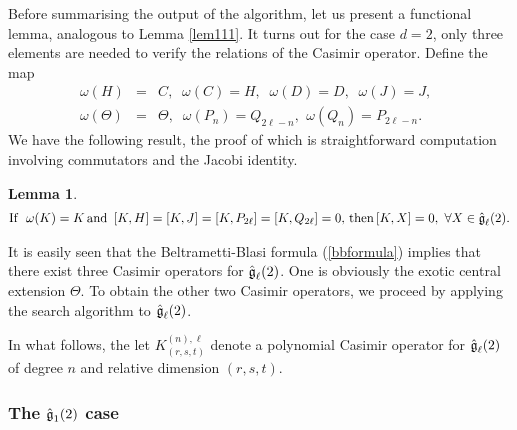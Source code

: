 \documentclass[12pt]{article}
\def\nn{\nonumber}
\newtheorem{lemma}{Lemma}%
\begin{document}
Before summarising the output of the algorithm, let us present a functional
lemma, analogous to Lemma \ref{lem111}. It turns out for the case $d=2$, only three
elements are needed to verify the relations of the Casimir operator. 
Define the map
\begin{eqnarray}
\omega(H)&=&C, \,\,\ \omega(C)=H, \,\,\ \omega(D)=D,\,\,\ \omega(J)=J, \,\,\
 \nn \\
\omega(\Theta)&=&\Theta, \,\,\ \omega(P_{n})=Q_ {2\ell-n} ,\,\ \omega(Q_{n})=P_
	{2\ell-n}.\label{omg2} 
\end{eqnarray}
We have the following result, the proof of which is straightforward computation
involving commutators and the Jacobi identity. 
\begin{lemma}\label{lem222}
\begin{eqnarray}
\text{If}\,\,\ \omega(K)=K  \, \text{and}\,\ [K, H]=[K,J]=[K,P_ {2\ell}]=[K,Q_
	{2\ell}]=0, \,\text{then} \, [K, X]=0, \,\, \forall X \in
	\mathfrak{\Hat{g}}_{\ell}(2).
\nn 
\end{eqnarray} 
 \end{lemma}
 
It is easily seen that the Beltrametti-Blasi formula (\ref{bbformula}) implies that there exist
three Casimir operators for $\mathfrak{\Hat{g}}_\ell(2)$. One is
obviously the exotic central extension $\Theta$. To obtain the other two Casimir
operators, we proceed by applying the search algorithm to $\mathfrak{\Hat{g}}_\ell(2)$.

In what follows, the let $K^{(n),\ell}_{(r,s,t)}$ denote 
a polynomial Casimir operator for $\mathfrak{\Hat{g}}_{\ell}(2)$ of degree $n$ and relative
dimension $(r,s, t)$.

\subsubsection{The $\mathfrak{\Hat{g}}_{1}(2)$  case }\label{ECGA1}
\end{document}
